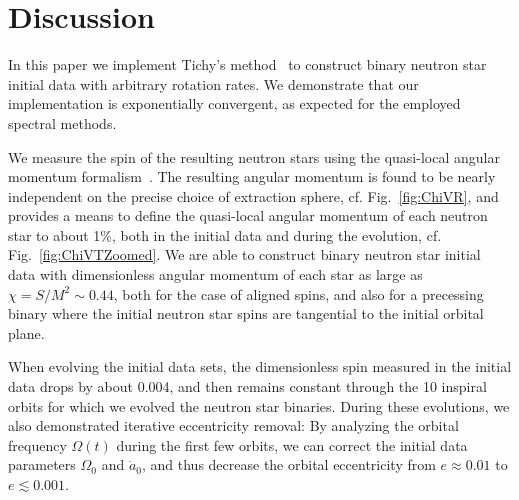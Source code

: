 \documentclass[aps,prd,amsmath,floatfix
,twocolumn
,superscriptaddress,nofootinbib,showpacs]{revtex4-1}
\theoremstyle{plain} \newtheorem{thm}{Theorem} \newtheorem{lem}{Lemma}
\begin{document}

\section{Discussion}
\label{sec:Discussion}



In this paper we implement Tichy's method~\cite{Tichy:2012rp} to
construct binary neutron star initial data with arbitrary rotation
rates.  We demonstrate that our implementation is exponentially
convergent, as expected for the employed spectral methods.


We measure the spin of the resulting neutron stars using the
quasi-local angular momentum
formalism~\cite{BrownYork1993,Cook2007,Lovelace2008,OwenThesis}.  The
resulting angular momentum is found to be nearly independent on the
precise choice of extraction sphere, cf. Fig.~\ref{fig:ChiVR}, and
provides a means to define the quasi-local angular momentum of each
neutron star to about 1\%, both in the initial data and during the
evolution, cf. Fig.~\ref{fig:ChiVTZoomed}.  We are able to construct
binary neutron star initial data with dimensionless angular momentum
of each star as large as $\chi=S/M^2\sim 0.44$, both for the case of
aligned spins, and also for a precessing binary where the initial
neutron star spins are tangential to the initial orbital plane.



When evolving the initial data sets, the dimensionless spin measured
in the initial data drops by about 0.004, and then remains constant
through the 10 inspiral orbits for which we evolved the neutron star
binaries.  During these evolutions, we also demonstrated iterative
eccentricity removal: By analyzing the orbital frequency $\Omega(t)$
during the first few orbits, we can correct the initial data
parameters $\Omega_0$ and $\dot a_0$, and thus decrease the orbital
eccentricity from $e\approx 0.01$ to $e\lesssim 0.001$.
\end{document}
